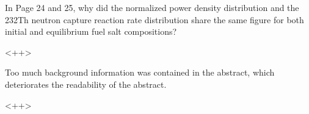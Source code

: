 \documentclass[answers,11pt]{exam}
\begin{document}
\begin{questions}
        \question  In Page 24 and 25, why did the normalized power density 
        distribution and the 232Th neutron capture reaction rate distribution 
        share the same figure for both initial and equilibrium fuel salt 
        compositions?
        \begin{solution}
                <++>
        \end{solution}

        \question  Too much background information was contained in the 
        abstract, which deteriorates the readability of the abstract.
        \begin{solution}
                <++>
        \end{solution}

\end{questions}


\end{document}
